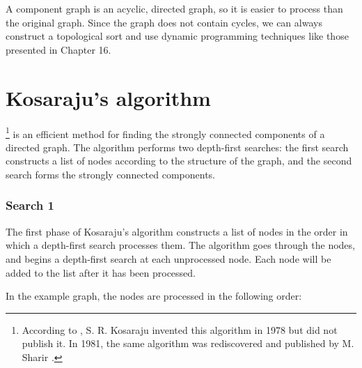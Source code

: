 A component graph is an acyclic, directed graph,
so it is easier to process than the original graph.
Since the graph does not contain cycles,
we can always construct a topological sort and
use dynamic programming techniques like those
presented in Chapter 16.

\section{Kosaraju's algorithm}


\footnote{According to \cite{aho83},
S. R. Kosaraju invented this algorithm in 1978
but did not publish it. In 1981, the same algorithm was rediscovered
and published by M. Sharir \cite{sha81}.} is an efficient
method for finding the strongly connected components
of a directed graph.
The algorithm performs two depth-first searches:
the first search constructs a list of nodes
according to the structure of the graph,
and the second search forms the strongly connected components.

\subsubsection{Search 1}

The first phase of Kosaraju's algorithm constructs
a list of nodes in the order in which a
depth-first search processes them.
The algorithm goes through the nodes,
and begins a depth-first search at each 
unprocessed node.
Each node will be added to the list
after it has been processed.

In the example graph, the nodes are processed
in the following order:
\begin{center}
\end{center}

